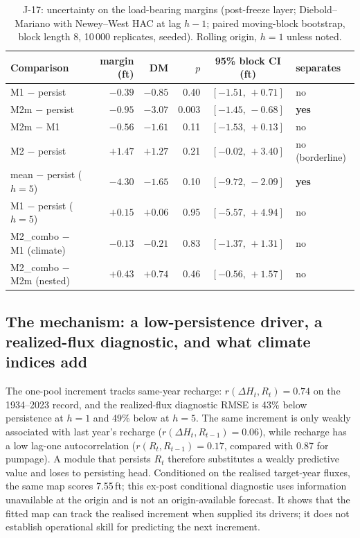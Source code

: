 \begin{table}[!htb]
\centering\small
\caption{J-17: uncertainty on the load-bearing margins (post-freeze layer; Diebold--Mariano with Newey--West HAC at lag $h-1$; paired moving-block bootstrap, block length 8, 10\,000 replicates, seeded). Rolling origin, $h=1$ unless noted.}
\label{tab:edwdm}
\scriptsize\setlength{\tabcolsep}{3pt}
\begin{tabular}{@{}lrrrcl@{}}
\toprule
Comparison & margin (ft) & DM & $p$ & 95\% block CI (ft) & separates \\
\midrule
M1 $-$ persist & $-0.39$ & $-0.85$ & 0.40 & $[-1.51,\,+0.71]$ & no \\
M2m $-$ persist & $-0.95$ & $-3.07$ & 0.003 & $[-1.45,\,-0.68]$ & \textbf{yes} \\
M2m $-$ M1 & $-0.56$ & $-1.61$ & 0.11 & $[-1.53,\,+0.13]$ & no \\
M2 $-$ persist & $+1.47$ & $+1.27$ & 0.21 & $[-0.02,\,+3.40]$ & no (borderline) \\
mean $-$ persist ($h=5$) & $-4.30$ & $-1.65$ & 0.10 & $[-9.72,\,-2.09]$ & \textbf{yes} \\
M1 $-$ persist ($h=5$) & $+0.15$ & $+0.06$ & 0.95 & $[-5.57,\,+4.94]$ & no \\
M2\_combo $-$ M1 (climate) & $-0.13$ & $-0.21$ & 0.83 & $[-1.37,\,+1.31]$ & no \\
M2\_combo $-$ M2m (nested) & $+0.43$ & $+0.74$ & 0.46 & $[-0.56,\,+1.57]$ & no \\
\bottomrule
\end{tabular}
\end{table}

\FloatBarrier
\subsection{The mechanism: a low-persistence driver, a realized-flux diagnostic, and what climate indices add}\label{sec:edw_mech}

The one-pool increment tracks same-year recharge: $r(\Delta H_t,R_t)=0.74$ on the 1934--2023 record, and the realized-flux diagnostic RMSE is 43\% below persistence at $h=1$ and 49\% below at $h=5$. The same increment is only weakly associated with last year's recharge ($r(\Delta H_t,R_{t-1})=0.06$), while recharge has a low lag-one autocorrelation ($r(R_t,R_{t-1})=0.17$, compared with 0.87 for pumpage). A module that persists $R_t$ therefore substitutes a weakly predictive value and loses to persisting head. Conditioned on the realised target-year fluxes, the same map scores 7.55\,ft; this ex-post conditional diagnostic uses information unavailable at the origin and is not an origin-available forecast. It shows that the fitted map can track the realised increment when supplied its drivers; it does not establish operational skill for predicting the next increment.

